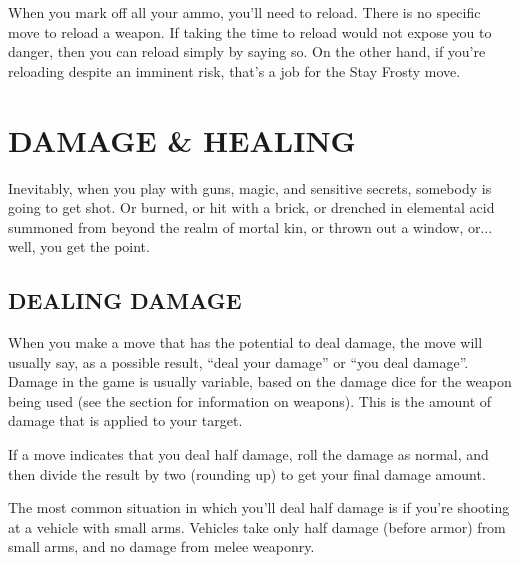 When you mark off all your ammo, you’ll need to reload. There is no specific move to reload a weapon. If taking the time to reload would not expose you to danger, then you can reload simply by saying so. On the other hand, if you’re reloading despite an imminent risk, that’s a job for the Stay Frosty move.



\section{DAMAGE \& HEALING}

Inevitably, when you play with guns, magic, and sensitive secrets, somebody is going to get shot. Or burned, or hit with a brick, or drenched in elemental acid summoned from beyond the realm of mortal kin, or thrown out a window, or... well, you get the point.


\subsection*{DEALING DAMAGE}
When you make a move that has the potential to deal damage, the move will usually say, as a possible result, ``deal your damage'' or ``you deal damage''. Damage in the game is usually variable, based on the damage dice for the weapon being used (see the  section for information on weapons). This is the amount of damage that is applied to your target.


If a move indicates that you deal half damage, roll the damage as normal, and then divide the result by two (rounding up) to get your final damage amount.

The most common situation in which you’ll deal half damage is if you’re shooting at a vehicle with small arms. Vehicles take only half damage (before armor) from small arms, and no damage from melee weaponry.



